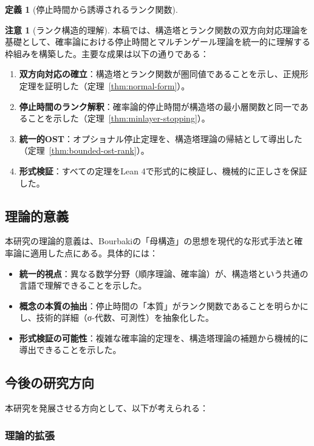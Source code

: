\documentclass[a4paper,11pt]{ltjsarticle}
\theoremstyle{definition}
\newtheorem{definition}[theorem]{定義}
\newtheorem{remark}[theorem]{注意}
\begin{document}
\begin{definition}[停止時間から誘導されるランク関数]
\begin{remark}[ランク構造的理解]
本稿では、構造塔とランク関数の双方向対応理論を基礎として、確率論における停止時間とマルチンゲール理論を統一的に理解する枠組みを構築した。主要な成果は以下の通りである：

\begin{enumerate}
\item \textbf{双方向対応の確立}：構造塔とランク関数が圏同値であることを示し、正規形定理を証明した（定理~\ref{thm:normal-form}）。

\item \textbf{停止時間のランク解釈}：確率論的停止時間が構造塔の最小層関数と同一であることを示した（定理~\ref{thm:minlayer-stopping}）。

\item \textbf{統一的OST}：オプショナル停止定理を、構造塔理論の帰結として導出した（定理~\ref{thm:bounded-ost-rank}）。

\item \textbf{形式検証}：すべての定理をLean 4で形式的に検証し、機械的に正しさを保証した。
\end{enumerate}

\subsection{理論的意義}

本研究の理論的意義は、Bourbakiの「母構造」の思想を現代的な形式手法と確率論に適用した点にある。具体的には：

\begin{itemize}
\item \textbf{統一的視点}：異なる数学分野（順序理論、確率論）が、構造塔という共通の言語で理解できることを示した。

\item \textbf{概念の本質の抽出}：停止時間の「本質」がランク関数であることを明らかにし、技術的詳細（σ-代数、可測性）を抽象化した。

\item \textbf{形式検証の可能性}：複雑な確率論的定理を、構造塔理論の補題から機械的に導出できることを示した。
\end{itemize}

\subsection{今後の研究方向}

本研究を発展させる方向として、以下が考えられる：

\subsubsection{理論的拡張}


\end{remark}
\end{definition}
\end{document}
